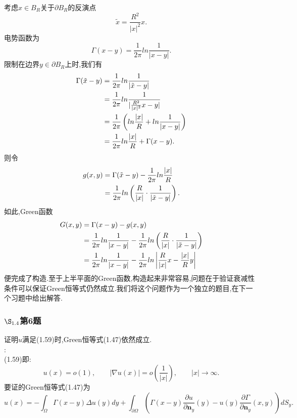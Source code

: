 \documentclass[12pt, a4paper]{article}
\begin{document}
	考虑$x\in B_R$关于$\partial B_R$的反演点$$\tilde{x}=\frac{R^2 }{|x|^2}x.$$
	电势函数为$$
	\Gamma (x-y)=\frac{1}{2\pi}	ln\frac{1}{|x-y|}.$$
	限制在边界$y\in \partial B_R$上时,我们有
	\begin{align}
		\Gamma(\tilde{x}-y)&=\frac{1}{2\pi}	ln\frac{1}{|\tilde{x}-y|} \notag\\
		&=\frac{1}{2\pi} ln\frac{1}{|\frac{R^2 }{|x|^2}x-y|} \notag \\
		&=\frac{1}{2\pi} \left( ln\frac{|x|}{R}+ln \frac{1}{|x-y|} \right) \notag \\
		&=\frac{1}{2\pi} ln\frac{|x|}{R}+ \Gamma (x-y) \notag .
	\end{align}
	则令
	\begin{align}
		g(x,y) &= \Gamma(\tilde{x}-y)-\frac{1}{2\pi} ln\frac{|x|}{R} \notag\\
		&= \frac{1}{2\pi} ln\left( \frac{R}{|x|} \cdot\frac{1}{|\tilde{x}-y|} \right)\notag.
	\end{align}
	如此,Green函数
	\begin{align}
		G(x,y)&=\Gamma(x-y) -g(x,y)\notag\\
		&=\frac{1}{2\pi} ln\frac{1}{|x-y|}-\frac{1}{2\pi} ln\left( \frac{R}{|x|} \cdot\frac{1}{|\tilde{x}-y|}\right) \notag\\
		&= \frac{1}{2\pi} ln\frac{1}{|x-y|}- \frac{1}{2\pi} ln \left| \frac{R}{|x|}x-\frac{|x|}{R}y\right| \notag
	\end{align}
	便完成了构造.至于上半平面的Green函数,构造起来非常容易,问题在于验证衰减性条件可以保证Green恒等式仍然成立.我们将这个问题作为一个独立的题目,在下一个习题中给出解答.
	
	\subsubsection{$\S_{1.4}$第6题}
	\kaishu{}证明$u$满足(1.59)时,Green恒等式(1.47)依然成立.\\
	
	\songti{}:\\
	
	(1.59)即:$$
	u(x)=o(1),\qquad |\nabla u(x)|=o\left( \frac{1}{|x|} \right), \qquad |x| \to \infty.	$$
	要证的Green恒等式(1.47)为$$
	u(x)= -\int_{\Omega} \Gamma(x-y) \Delta u(y) dy + \int_{\partial \Omega} \left(\Gamma(x-y) \frac{\partial u}{\partial \bm{n}_y}(y) -u(y)\frac{\partial \Gamma}{\partial \bm{n}_y}(x,y)   \right) dS_y.	$$
	
	
\end{document}
